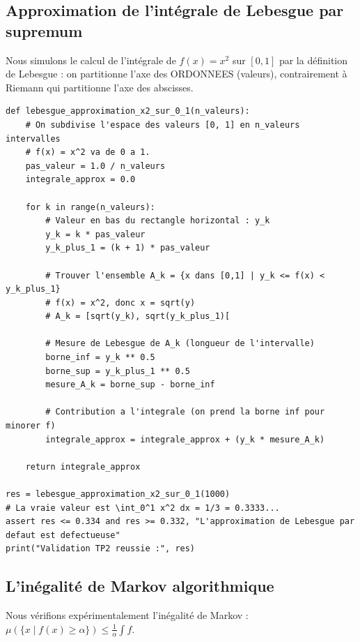 \documentclass[11pt,a4paper]{article}
\begin{document}
\subsection*{Approximation de l'int\'egrale de Lebesgue par supremum}

Nous simulons le calcul de l'int\'egrale de $f(x) = x^2$ sur $[0, 1]$ par la d\'efinition de Lebesgue : on partitionne l'axe des ORDONNEES (valeurs), contrairement \`a Riemann qui partitionne l'axe des abscisses.

\begin{lstlisting}
def lebesgue_approximation_x2_sur_0_1(n_valeurs):
    # On subdivise l'espace des valeurs [0, 1] en n_valeurs intervalles
    # f(x) = x^2 va de 0 a 1.
    pas_valeur = 1.0 / n_valeurs
    integrale_approx = 0.0

    for k in range(n_valeurs):
        # Valeur en bas du rectangle horizontal : y_k
        y_k = k * pas_valeur
        y_k_plus_1 = (k + 1) * pas_valeur

        # Trouver l'ensemble A_k = {x dans [0,1] | y_k <= f(x) < y_k_plus_1}
        # f(x) = x^2, donc x = sqrt(y)
        # A_k = [sqrt(y_k), sqrt(y_k_plus_1)[

        # Mesure de Lebesgue de A_k (longueur de l'intervalle)
        borne_inf = y_k ** 0.5
        borne_sup = y_k_plus_1 ** 0.5
        mesure_A_k = borne_sup - borne_inf

        # Contribution a l'integrale (on prend la borne inf pour minorer f)
        integrale_approx = integrale_approx + (y_k * mesure_A_k)

    return integrale_approx

res = lebesgue_approximation_x2_sur_0_1(1000)
# La vraie valeur est \int_0^1 x^2 dx = 1/3 = 0.3333...
assert res <= 0.334 and res >= 0.332, "L'approximation de Lebesgue par defaut est defectueuse"
print("Validation TP2 reussie :", res)
\end{lstlisting}


\subsection*{L'in\'egalit\'e de Markov algorithmique}

Nous v\'erifions exp\'erimentalement l'in\'egalit\'e de Markov : $\mu(\{x \mid f(x) \ge \alpha\}) \le \frac{1}{\alpha} \int f$.
\end{document}

